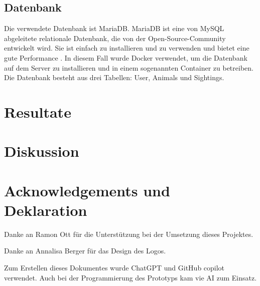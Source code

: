 \documentclass{article}
\begin{document}
\subsection{Datenbank} %

Die verwendete Datenbank ist MariaDB. MariaDB ist eine von MySQL abgeleitete relationale Datenbank, die von der
Open-Source-Community entwickelt wird. Sie ist einfach zu installieren und zu verwenden und bietet eine gute Performance \autocite{MariaDBFoundation}.
In diesem Fall wurde Docker verwendet, um die Datenbank auf dem Server zu installieren und in einem 
sogenannten Container zu betreiben. Die Datenbank besteht aus drei Tabellen: User, Animals und Sightings.

\section{Resultate} %

\section{Diskussion} %


\section{Acknowledgements und Deklaration} %

Danke an Ramon Ott für die Unterstützung bei der Umsetzung dieses Projektes.

Danke an Annalisa Berger für das Design des Logos.

Zum Erstellen dieses Dokumentes wurde ChatGPT und GitHub copilot verwendet.
Auch bei der Programmierung des Prototyps kam vie AI zum Einsatz.
\end{document}
